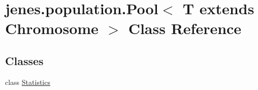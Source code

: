 \hypertarget{classjenes_1_1population_1_1_pool_3_01_t_01extends_01_chromosome_01_4}{\section{jenes.\-population.\-Pool$<$ T extends Chromosome $>$ Class Reference}
\label{classjenes_1_1population_1_1_pool_3_01_t_01extends_01_chromosome_01_4}
}
\subsection*{Classes}
\begin{DoxyCompactItemize}
\item 
class \hyperlink{classjenes_1_1population_1_1_pool_3_01_t_01extends_01_chromosome_01_4_1_1_statistics}{Statistics}
\end{DoxyCompactItemize}
